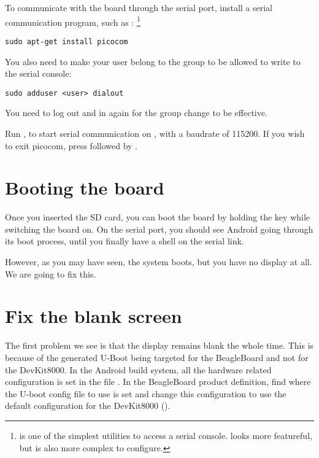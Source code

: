 To communicate with the board through the serial port, install a
serial communication program, such as :
\footnote{ is one of the simplest utilities to access a
  serial console.  looks more featureful, but is also
  more complex to configure.}

\begin{verbatim}
sudo apt-get install picocom
\end{verbatim}

You also need to make your user belong to the  group to be
allowed to write to the serial console:

\begin{verbatim}
sudo adduser <user> dialout
\end{verbatim}

You need to log out and in again for the group change to be effective.

Run , to start serial
communication on , with a baudrate of 115200. If
you wish to exit picocom, press \code{[Ctrl][a]} followed by
\code{[Ctrl][x]}.

\section{Booting the board}

Once you inserted the SD card, you can boot the board by holding the
 key while switching the board on. On the serial port, you
should see Android going through its boot process, until you finally
have a shell on the serial link.

However, as you may have seen, the system boots, but you have no
display at all. We are going to fix this.

\section{Fix the blank screen}

The first problem we see is that the display remains blank the whole
time. This is because of the generated U-Boot being targeted for the
BeagleBoard and not for the DevKit8000. In the Android build system,
all the hardware related configuration is set in the file
. In the BeagleBoard product definition, find
where the U-boot config file to use is set and change this
configuration to use the default configuration for the DevKit8000
().

